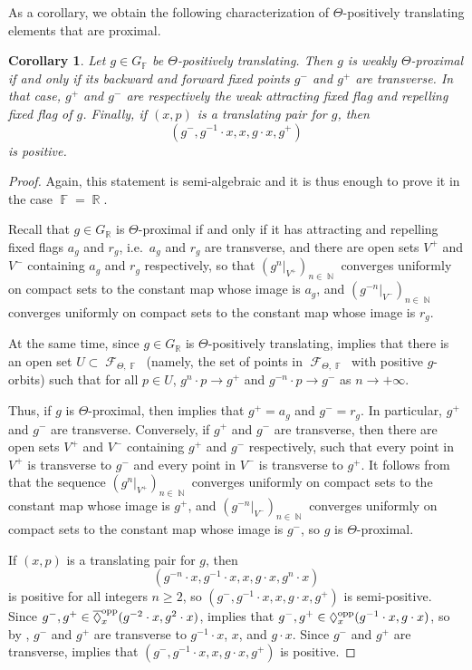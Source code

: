 \documentclass{amsart}
\theoremstyle{plain}
\newtheorem{corollary}[proposition]{Corollary}
\theoremstyle{definition}
\DeclareMathOperator{\Diam}{\lozenge}
\DeclareMathOperator{\Fc}{\mathcal{F}}
\DeclareMathOperator{\Fb}{{\mathbb{F}}}
\DeclareMathOperator{\Nb}{{\mathbb{N}}}
\DeclareMathOperator{\Rb}{{\mathbb{R}}}
\newcommand{\1}{\mathbf{1}}
\begin{document}
As a corollary, we obtain the following characterization of $\Theta$-positively translating elements that are proximal.

\begin{corollary}\label{corol: CharWeakThetaProxForPosTrans}
    Let $g\in G_{\Fb}$ be $\Theta$-positively translating.
    Then $g$ is weakly $\Theta$-proximal if and only if its backward and forward fixed points $g^-$ and $g^+$ are transverse. In that case, $g^+$ and $g^-$ are respectively the weak attracting fixed flag and repelling fixed flag of $g$. Finally, if $(x,p)$ is a translating pair for $g$, then
    \[(g^-,g^{-1}\cdot x, x, g\cdot x, g^+)\]
    is positive.
\end{corollary}

\begin{proof}
    Again, this statement is semi-algebraic and it is thus enough to prove it in the case $\Fb=\Rb$.

    Recall that $g\in G_{\Rb}$ is $\Theta$-proximal if and only if it has attracting and repelling fixed flags $a_g$ and $r_g$, i.e.\ $a_g$ and $r_g$ are transverse, and there are open sets $V^+$ and $V^-$ containing $a_g$ and $r_g$ respectively, so that $(g^n|_{V^+})_{n\in\Nb}$ converges uniformly on compact sets to the constant map whose image is $a_g$, and $(g^{-n}|_{V^-})_{n\in\Nb}$ converges uniformly on compact sets to the constant map whose image is $r_g$. 

    At the same time, since $g\in G_{\Rb}$ is $\Theta$-positively translating,  implies that there is an open set $U\subset\Fc_{\Theta,\Fb}$ (namely, the set of points in $\Fc_{\Theta,\Fb}$ with positive $g$-orbits) such that for all $p\in U$, $g^n\cdot p\to g^+$ and $g^{-n}\cdot p\to g^-$ as $n\to +\infty$.

    Thus, if $g$ is $\Theta$-proximal, then  implies that $g^+=a_g$ and $g^-=r_g$. In particular, $g^+$ and $g^-$ are transverse. Conversely, if $g^+$ and $g^-$ are transverse, then there are open sets $V^+$ and $V^-$ containing $g^+$ and $g^-$ respectively, such that every point in $V^+$ is transverse to $g^-$ and every point in $V^-$ is transverse to $g^+$. It follows from  that the sequence $(g^n|_{V^+})_{n\in\Nb}$ converges uniformly on compact sets to the constant map whose image is $g^+$, and $(g^{-n}|_{V^-})_{n\in\Nb}$ converges uniformly on compact sets to the constant map whose image is $g^-$, so $g$ is $\Theta$-proximal. 

    If $(x,p)$ is a translating pair for $g$, then 
    \[(g^{-n}\cdot x,g^{-1}\cdot x,x,g\cdot x,g^n\cdot x)\] 
    is positive for all integers $n\ge 2$, so $(g^-,g^{-1}\cdot x,x,g\cdot x,g^+)$ is semi-positive. Since $g^-,g^+\in\overline{\Diam}_x^{\rm opp}(g^{-2}\cdot x,g^2\cdot x)$,  implies that $g^-,g^+\in\Diam_x^{\rm opp}(g^{-1}\cdot x,g\cdot x)$, so by , $g^-$ and $g^+$ are transverse to $g^{-1}\cdot x$, $x$, and $g\cdot x$. Since $g^-$ and $g^+$ are transverse,  implies that $(g^-,g^{-1}\cdot x,x,g\cdot x,g^+)$ is positive.
\end{proof}
\end{document}
